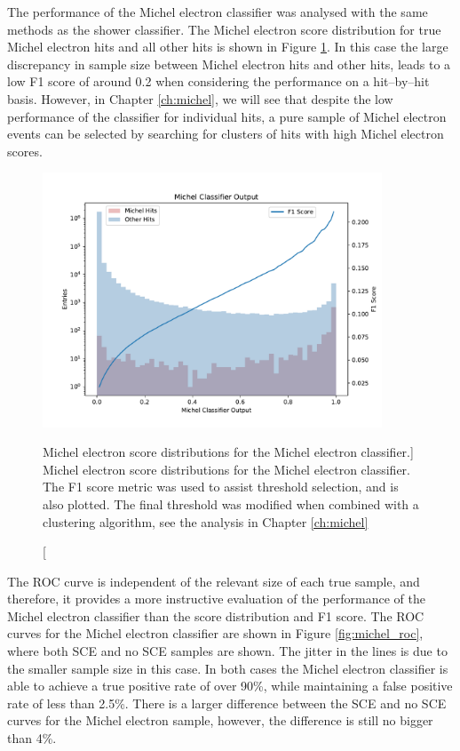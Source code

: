The performance of the Michel electron classifier was analysed with the same
methods as the shower classifier. The Michel electron score distribution for
true Michel electron hits and all other hits is shown in Figure
\ref{fig:michel_output}. In this case the large discrepancy in sample size
between Michel electron hits and other hits, leads to a low F1 score of around
0.2 when considering the performance on a hit--by--hit basis. However, in
Chapter \ref{ch:michel}, we will see that despite the low performance of the
classifier for individual hits, a pure sample of Michel electron events can be
selected by searching for clusters of hits with high Michel electron scores.

\begin{figure}
	\centering
	\includegraphics[width=0.9\textwidth]{figures/michel_combined.pdf} 
	\caption
	[Michel electron score distributions for the Michel electron classifier.]
	{Michel electron score distributions for the Michel electron classifier. 
	The F1 score metric was used to assist threshold selection, and is also
	plotted. The final threshold was modified when combined with a clustering
	algorithm, see the analysis in Chapter \ref{ch:michel}}
	\label{fig:michel_output}
\end{figure}

The ROC curve is independent of the relevant size of each true sample, and
therefore, it provides a more instructive evaluation of the performance of the
Michel electron classifier than the score distribution and F1 score. The ROC 
curves for the Michel electron classifier are shown in Figure 
\ref{fig:michel_roc}, where both SCE and no SCE samples are shown. The jitter 
in the lines is due to the smaller sample size in this case. In both cases the 
Michel electron classifier is able to achieve a true positive rate of over 90\%,
while maintaining a false positive rate of less than 2.5\%. There is a larger 
difference between the SCE and no SCE curves for the Michel electron sample,
however, the difference is still no bigger than 4\%.


